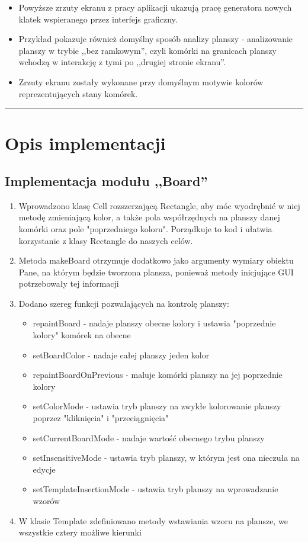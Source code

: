 \documentclass[a4paper,11pt]{article}
\newcommand{\linia}{\rule{\linewidth}{0.4mm}}
\begin{document}
\begin{itemize}
\item Powyższe zrzuty ekranu z pracy aplikacji ukazują pracę generatora nowych klatek wspieranego przez interfejs graficzny. 
\item Przykład pokazuje również domyślny sposób analizy planszy - analizowanie planszy w trybie ,,bez ramkowym'', czyli komórki na granicach planszy wchodzą w interakcję z tymi po ,,drugiej stronie ekranu''.
\item Zrzuty ekranu zostały wykonane przy domyślnym motywie kolorów reprezentujących stany komórek.
\end{itemize}

\noindent\linia
\section{Opis implementacji}

\subsection{Implementacja modułu ,,Board''}

\begin{enumerate}
\item Wprowadzono klasę Cell rozszerzającą Rectangle, aby móc wyodrębnić w niej metodę zmieniającą kolor, a także pola współrzędnych na planszy danej komórki oraz pole "poprzedniego koloru". Porządkuje to kod i ułatwia korzystanie z klasy Rectangle do naszych celów.
\item Metoda makeBoard otrzymuje dodatkowo jako argumenty wymiary obiektu Pane, na którym będzie tworzona plansza, ponieważ metody inicjujące GUI potrzebowały tej informacji
\item Dodano szereg funkcji pozwalających na kontrolę planszy:
	\begin{itemize}
	\item repaintBoard - nadaje planszy obecne kolory i ustawia "poprzednie kolory" komórek na obecne
	\item setBoardColor - nadaje całej planszy jeden kolor
	\item repaintBoardOnPrevious - maluje komórki planszy na jej poprzednie kolory
	\item setColorMode - ustawia tryb planszy na zwykłe kolorowanie planszy poprzez "kliknięcia" i "przeciągnięcia"
	\item setCurrentBoardMode - nadaje wartość obecnego trybu planszy
	\item setInsensitiveMode - ustawia tryb planszy, w którym jest ona nieczuła na edycje
	\item setTemplateInsertionMode - ustawia tryb planszy na wprowadzanie wzorów
	\end{itemize}

\item W klasie Template zdefiniowano metody wstawiania wzoru na plansze, we wszystkie cztery możliwe kierunki

\end{enumerate}
\end{document}
